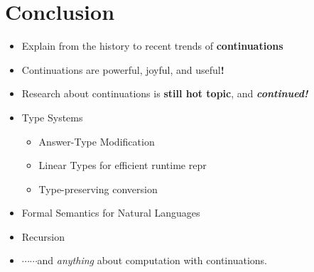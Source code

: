 \section{Conclusion}

\begin{frame}
	\frametitlesec{}
	\vspace*{-.8\baselineskip}

	\begin{tcolorbox}[enhanced,boxrule=1pt,right skip=0pt,left skip=0pt, boxsep=2pt, right = .3em,left = .3em, title={Summary}, colframe=subhighlight,colback=subhighlight!5]
		\footnotesize
		\begin{itemize}
			\setlength\itemsep{-.1\zh}
			\item Explain from the history to recent trends of \textbf{continuations}
			\item Continuations are powerful, joyful, and useful\textbf{!}
			      \vspace*{-.2\baselineskip}

			\item Research about continuations is \textbf{still hot topic}, and {\normalsize\textbf{\textit{continued!}}}
		\end{itemize}
	\end{tcolorbox}

	\begin{tcolorbox}[enhanced,boxrule=1pt,right skip=0pt,left skip=0pt, boxsep=0pt, right = .3em,left = .3em,title={Couldn't talk today \emoji{sob}},colframe=highlight!80,colback=highlight!5]

		\footnotesize
		\begin{itemize}
			\setlength\itemsep{-.1\zh}
			\item Type Systems

			      \begin{itemize}
				      \footnotesize
				      \item Answer-Type Modification
				      \item Linear Types for efficient runtime repr
				      \item Type-preserving conversion
			      \end{itemize}
			\item Formal Semantics for Natural Languages
			\item Recursion
			\item $\cdots\cdots$and \textit{anything} about computation with continuations.
		\end{itemize}
	\end{tcolorbox}

\end{frame}
